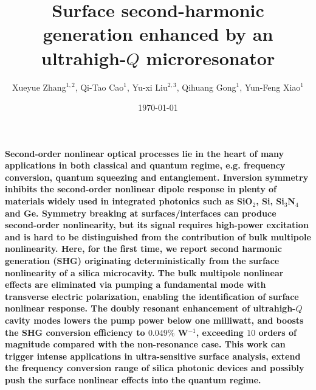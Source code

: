 \documentclass[a4paper,8pt,hyperref, twocolumn]{article}
\title{\bfseries \Large 
Surface second-harmonic generation enhanced by an ultrahigh-$Q$ microresonator
}
\author{\normalsize  Xueyue Zhang$^{1,2}$, Qi-Tao Cao$^{1}$, Yu-xi Liu$^{2,3}$, Qihuang Gong$^{1}$, Yun-Feng Xiao$^{1}$}
\date{\normalsize \today}
\begin{document}
\maketitle




\textbf{
Second-order nonlinear optical processes lie in the heart of many applications in both classical and quantum regime, e.g. frequency conversion,  quantum squeezing and entanglement. 
Inversion symmetry inhibits the second-order nonlinear dipole response in plenty of materials widely used in integrated photonics such as SiO$_2$, Si, Si$_3$N$_4$ and Ge.
Symmetry breaking %
at surfaces/interfaces can produce second-order nonlinearity, but its signal requires high-power excitation and is hard to be distinguished from the contribution of bulk multipole nonlinearity.  %
Here, for the first time, we report second harmonic generation (SHG) originating deterministically from the surface nonlinearity of a silica microcavity.
The bulk multipole nonlinear effects are eliminated via pumping a fundamental mode with transverse electric polarization, enabling the identification of surface nonlinear response.
The doubly resonant enhancement of ultrahigh-$Q$ cavity modes lowers the pump power below one milliwatt, and boosts the SHG conversion efficiency to $0.049\%$ W$^{-1}$, exceeding $10$ orders of magnitude compared with the non-resonance case. 
This work can trigger intense applications in ultra-sensitive surface analysis, extend the frequency conversion range of silica photonic devices and possibly push the surface nonlinear effects into the quantum regime.
}
\end{document}
